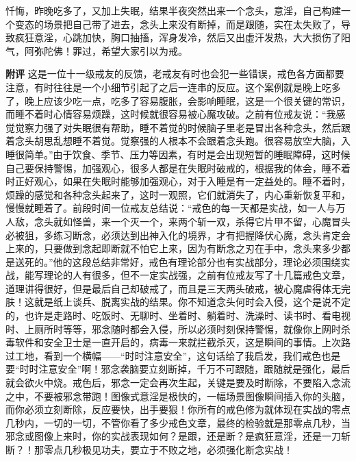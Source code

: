 \begin{case}
    忏悔，昨晚吃多了，又加上失眠，结果半夜突然出来一个念头，意淫，自己构建一个变态的场景把自己带了进去，念头上来没有断掉，而是跟随，实在太失败了，导致疯狂意淫，心跳加快，胸口抽搐，浑身发冷，然后又出虚汗发热，大大损伤了阳气，阿弥陀佛！罪过，希望大家引以为戒。

    \textbf{附评} 这是一位十一级戒友的反馈，老戒友有时也会犯一些错误，戒色各方面都要注意，有时往往是一个小细节引起了之后一连串的反应。这个案例就是晚上吃多了，晚上应该少吃一点，吃多了容易腹胀，会影响睡眠，这是一个很关键的常识，而睡不着时心情容易烦躁，这时候就很容易被心魔攻破。之前有位戒友说：“我感觉觉察力强了对失眠很有帮助，睡不着觉的时候脑子里老是冒出各种念头，然后跟着念头胡思乱想睡不着觉。觉察强的人根本不会跟着念头跑。很容易放空大脑，入睡很简单。”由于饮食、季节、压力等因素，有时是会出现短暂的睡眠障碍，这时候自己要保持警惕，加强观心，很多人都是在失眠时破戒的，根据我的体会，睡不着时正好观心，如果在失眠时能够加强观心，对于入睡是有一定益处的。睡不着时，烦躁的感觉和各种念头起来了，这时一观照，它们就消失了，内心重新恢复平和，慢慢就睡着了。前段时间一位戒友总结说：“戒色的每一天都是实战，如一人与万人敌，念头就如怪兽，来一个灭一个，来两个斩一双，杀得它片甲不留，心魔冒头必被狙，多练习断念，必须达到出神入化的境界，才有把握降伏心魔，念头肯定会上来的，只要做到念起即断就不怕它上来，因为有断念之刃在手中，念头来多少都是送死的。”他的这段总结非常好，戒色有理论部分也有实战部分，理论必须围绕实战，能写理论的人有很多，但不一定实战强，之前有位戒友写了十几篇戒色文章，道理讲得很好，但是最后自己却破戒了，而且是三天两头破戒，被心魔虐得体无完肤！这就是纸上谈兵、脱离实战的结果。你不知道念头何时会入侵，这个是说不定的，也许是走路时、吃饭时、无聊时、坐着时、躺着时、洗澡时、读书时、看电视时、上厕所时等等，邪念随时都会入侵，所以必须时刻保持警惕，就像你上网时杀毒软件和安全卫士是一直开启的，病毒一来就拦截杀灭，这是瞬间的事情。上次路过工地，看到一个横幅——“时时注意安全”，这句话给了我启发，我们戒色也是要“时时注意安全”啊！邪念袭脑要立刻断掉，千万不可跟随，跟随就是强化，最后就会欲火中烧。戒色后，邪念一定会再次生起，关键是要及时断除，不要陷入念流之中，不要被邪念带跑！图像式意淫是极快的，一幅场景图像瞬间插入你的头脑，而你必须立刻断除，反应要快，出手要狠！你所有的戒色修为就体现在实战的零点几秒内，一切的一切，不管你看了多少戒色文章，最终的检验就是那零点几秒，当邪念或图像上来时，你的实战表现如何？是跟，还是断？是疯狂意淫，还是一刀斩断？！那零点几秒极见功夫，要立于不败之地，必须强化断念实战！
\end{case}

